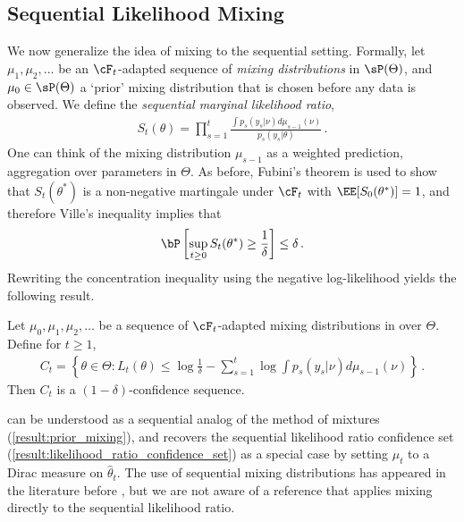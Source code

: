 \subsection{Sequential Likelihood Mixing}\label{sec:mixing}
% 
% 
We now generalize the idea of mixing to the sequential setting.
Formally, let $\mu_1, \mu_2, \dots$ be an $\cF_t$-adapted sequence of \emph{mixing distributions} in $\sP(\Theta)$, and $\mu_0 \in \sP(\Theta)$ a `prior' mixing distribution that is chosen before any data is observed. We define the \emph{sequential marginal likelihood ratio}, 
\begin{align*}
    S_t(\theta)= \prod_{s=1}^t  \frac{\int p_s(y_s|\nu) d\mu_{s-1}(\nu)}{p_s(y_s|\theta)} \,.
\end{align*}
One can think of the mixing distribution $\mu_{s-1}$ as a weighted prediction, aggregation over parameters in $\Theta$. As before, Fubini's theorem is used to show that $S_t(\theta^*)$ is a non-negative martingale under $\cF_t$ with $\EE[S_0(\theta^*)] = 1$, and therefore Ville's inequality implies that
\begin{align*}
     \bP\left[\sup_{t \geq 0} S_t(\theta^*) \geq \frac{1}{\delta}\right] \leq \delta \,.
\end{align*}
Rewriting the concentration inequality using the negative log-likelihood yields the following result.
\begin{theorem}\label{result:posterior_mixing} Let $\mu_0, \mu_1, \mu_2,\dots$ be a sequence of $\cF_t$-adapted mixing distributions in over $\Theta$. Define for $t \geq 1$,
    \begin{align*}
        C_t  = \left\{ \theta \in \Theta: L_t(\theta) \leq  \log \frac{1}{\delta} - \sum_{s=1}^t \log \int p_s(y_s|\nu) d\mu_{s-1}(\nu)\right\} \,.
    \end{align*}
    Then $C_t$ is a $(1-\delta)$-confidence sequence.
\end{theorem}
  can be understood as a sequential analog of the method of mixtures (\cref{result:prior_mixing}), and recovers the sequential likelihood ratio confidence set (\cref{result:likelihood_ratio_confidence_set}) as a special case by setting $\mu_t$ to a Dirac measure on $\hat \theta_t$. The use of sequential mixing distributions has appeared in the literature before \cite[e.g.,][]{kirschner2018information,Emm23,flynn2024tighter}, but we are not aware of a reference that applies mixing directly to the sequential likelihood ratio.



